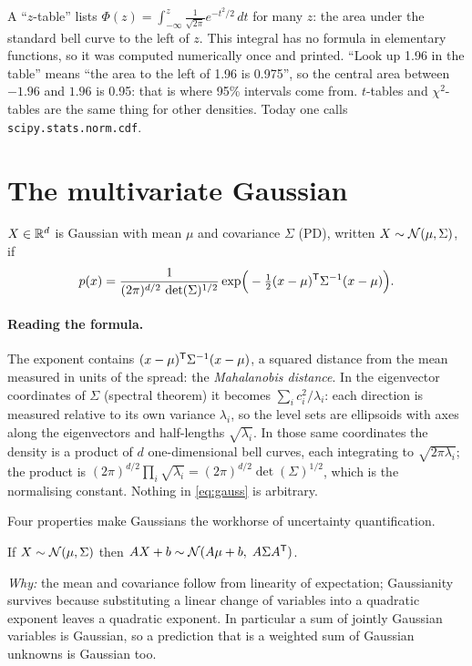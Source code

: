\begin{connection}
A ``$z$-table'' lists $\Phi(z) = \int_{-\infty}^{z} \frac{1}{\sqrt{2\pi}} e^{-t^2/2}\,dt$ for many $z$: the area
under the standard bell curve to the left of $z$. This integral has no formula in elementary functions, so it was
computed numerically once and printed. ``Look up 1.96 in the table'' means ``the area to the left of 1.96 is
0.975'', so the central area between $-1.96$ and $1.96$ is 0.95: that is where 95\% intervals come from. $t$-tables
and $\chi^2$-tables are the same thing for other densities. Today one calls \texttt{scipy.stats.norm.cdf}.
\end{connection}

\section{The multivariate Gaussian}
\label{sec:gauss}

\begin{definition}
$X \in \mathbb{R}^d$ is Gaussian with mean $\mu$ and covariance $\Sigma$ (PD), written $X \sim \mathcal{N}(\mu, \Sigma)$, if
\begin{equation}
  p(x) = \frac{1}{(2\pi)^{d/2}\, \det(\Sigma)^{1/2}}
  \exp\!\Big(-\tfrac12 (x - \mu)^{\mathsf{T}} \Sigma^{-1} (x - \mu)\Big).
  \label{eq:gauss}
\end{equation}
\end{definition}
\paragraph{Reading the formula.} The exponent contains $(x-\mu)^{\mathsf{T}}\Sigma^{-1}(x-\mu)$, a squared distance from the mean
measured in units of the spread: the \emph{Mahalanobis distance}. In the eigenvector coordinates of $\Sigma$ (spectral
theorem) it becomes $\sum_i c_i^2/\lambda_i$: each direction is measured relative to its own variance $\lambda_i$, so
the level sets are ellipsoids with axes along the eigenvectors and half-lengths $\sqrt{\lambda_i}$. In those same
coordinates the density is a product of $d$ one-dimensional bell curves, each integrating to $\sqrt{2\pi\lambda_i}$;
the product is $(2\pi)^{d/2}\prod_i\sqrt{\lambda_i} = (2\pi)^{d/2}\det(\Sigma)^{1/2}$, which is the normalising
constant. Nothing in \eqref{eq:gauss} is arbitrary.

Four properties make Gaussians the workhorse of uncertainty quantification.
\begin{result}
If $X \sim \mathcal{N}(\mu,\Sigma)$ then $AX + b \sim \mathcal{N}(A\mu + b,\; A\Sigma A^{\mathsf{T}})$.
\end{result}
\emph{Why:} the mean and covariance follow from linearity of expectation; Gaussianity survives because substituting
a linear change of variables into a quadratic exponent leaves a quadratic exponent. In particular a sum of jointly
Gaussian variables is Gaussian, so a prediction that is a weighted sum of Gaussian unknowns is Gaussian too.

